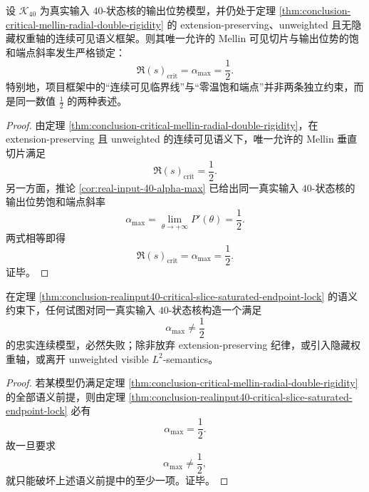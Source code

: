 \begin{theorem}\label{thm:conclusion-realinput40-critical-slice-saturated-endpoint-lock}
设 \(\mathcal K_{40}\) 为真实输入 \(40\)-状态核的输出位势模型，并仍处于定理 \ref{thm:conclusion-critical-mellin-radial-double-rigidity} 的 extension-preserving、unweighted 且无隐藏权重轴的连续可见语义框架。则其唯一允许的 Mellin 可见切片与输出位势的饱和端点斜率发生严格锁定：
\[
\Re(s)_{\mathrm{crit}}
=
\alpha_{\max}
=
\frac12.
\]
特别地，项目框架中的“连续可见临界线”与“零温饱和端点”并非两条独立约束，而是同一数值 \(\frac12\) 的两种表述。
\end{theorem}
\begin{proof}
由定理 \ref{thm:conclusion-critical-mellin-radial-double-rigidity}，在 extension-preserving 且 unweighted 的连续可见语义下，唯一允许的 Mellin 垂直切片满足
\[
\Re(s)_{\mathrm{crit}}=\frac12.
\]
另一方面，推论 \ref{cor:real-input-40-alpha-max} 已给出同一真实输入 \(40\)-状态核的输出位势饱和端点斜率
\[
\alpha_{\max}=\lim_{\theta\to+\infty}P'(\theta)=\frac12.
\]
两式相等即得
\[
\Re(s)_{\mathrm{crit}}=\alpha_{\max}=\frac12.
\]
证毕。
\end{proof}

\begin{corollary}[斜率失配的连续模型禁阻]\label{cor:conclusion-realinput40-slope-mismatch-continuous-model-obstruction}
在定理 \ref{thm:conclusion-realinput40-critical-slice-saturated-endpoint-lock} 的语义约束下，任何试图对同一真实输入 \(40\)-状态核构造一个满足
\[
\alpha_{\max}\neq \frac12
\]
的忠实连续模型，必然失败；除非放弃 extension-preserving 纪律，或引入隐藏权重轴，或离开 unweighted visible \(L^2\)-semantics。
\end{corollary}
\begin{proof}
若某模型仍满足定理 \ref{thm:conclusion-critical-mellin-radial-double-rigidity} 的全部语义前提，则由定理 \ref{thm:conclusion-realinput40-critical-slice-saturated-endpoint-lock} 必有
\[
\alpha_{\max}=\frac12.
\]
故一旦要求
\[
\alpha_{\max}\neq \frac12,
\]
就只能破坏上述语义前提中的至少一项。证毕。
\end{proof}

